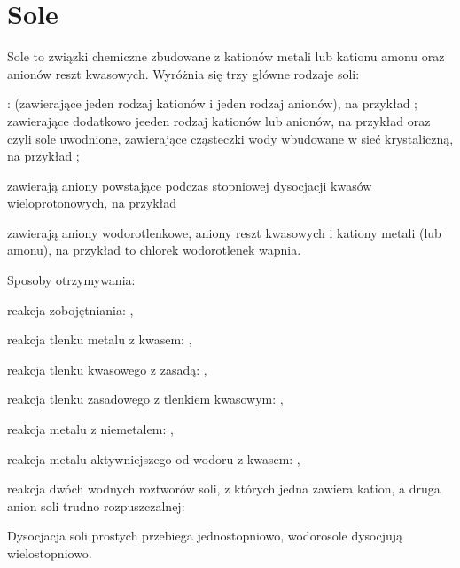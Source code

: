 \section{Sole}
Sole to związki chemiczne zbudowane z kationów metali lub kationu amonu  oraz anionów reszt kwasowych.
Wyróżnia się trzy główne rodzaje soli:
\begin{compactitem}
\item {}:  (zawierające jeden rodzaj kationów i jeden rodzaj anionów), na przykład ;  zawierające dodatkowo jeeden rodzaj kationów lub anionów, na przykład  oraz  czyli sole uwodnione, zawierające cząsteczki wody wbudowane w sieć krystaliczną, na przykład ;
\item {} zawierają aniony powstające podczas stopniowej dysocjacji kwasów wieloprotonowych, na przykład 
\item {} zawierają aniony wodorotlenkowe, aniony reszt kwasowych i kationy metali (lub amonu), na przykład  to chlorek wodorotlenek wapnia.
\end{compactitem}

Sposoby otrzymywania:
\begin{compactitem}
\item reakcja zobojętniania: ,
\item reakcja tlenku metalu z kwasem: ,
\item reakcja tlenku kwasowego z zasadą: ,    
\item reakcja tlenku zasadowego z tlenkiem kwasowym: ,
\item reakcja metalu z niemetalem: ,
\item reakcja metalu aktywniejszego od wodoru z kwasem: ,
\item reakcja dwóch wodnych roztworów soli, z których jedna zawiera kation, a druga anion soli trudno rozpuszczalnej: 
\end{compactitem}

Dysocjacja soli prostych przebiega jednostopniowo, wodorosole dysocjują wielostopniowo.